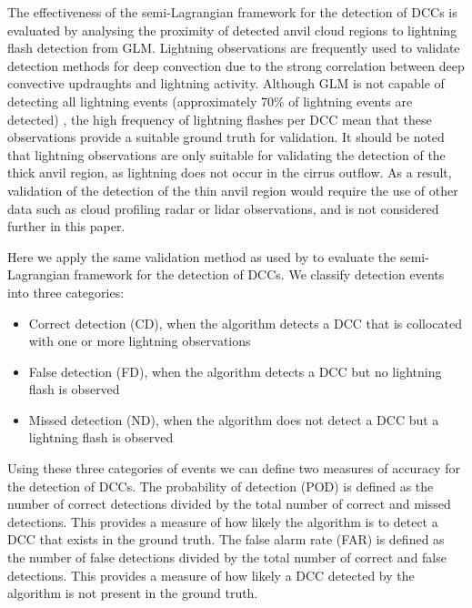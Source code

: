 \documentclass[amt, manuscript]{copernicus}
\begin{document}
The effectiveness of the semi-Lagrangian framework for the detection of DCCs is evaluated by analysing the proximity of detected anvil cloud regions to lightning flash detection from GLM.
Lightning observations are frequently used to validate detection methods for deep convection \citep[e.g.,][]{zinner_validation_2013, muller_novel_2019} due to the strong correlation between deep convective updraughts and lightning activity.
Although GLM is not capable of detecting all lightning events (approximately 70\% of lightning events are detected) \citep{peterson_removing_2020}, the high frequency of lightning flashes per DCC mean that these observations provide a suitable ground truth for validation.
It should be noted that lightning observations are only suitable for validating the detection of the thick anvil region, as lightning does not occur in the cirrus outflow.
As a result, validation of the detection of the thin anvil region would require the use of other data such as cloud profiling radar or lidar observations, and is not considered further in this paper.

Here we apply the same validation method as used by \citet{muller_novel_2019} to evaluate the semi-Lagrangian framework for the detection of DCCs.
We classify detection events into three categories:

\begin{itemize}
    \item Correct detection (CD), when the algorithm detects a DCC that is collocated with one or more lightning observations
    \item False detection (FD), when the algorithm detects a DCC but no lightning flash is observed
    \item Missed detection (ND), when the algorithm does not detect a DCC but a lightning flash is observed
\end{itemize}

Using these three categories of events we can define two measures of accuracy for the detection of DCCs.
The probability of detection (POD) is defined as the number of correct detections divided by the total number of correct and missed detections.
This provides a measure of how likely the algorithm is to detect a DCC that exists in the ground truth.
The false alarm rate (FAR) is defined as the number of false detections divided by the total number of correct and false detections.
This provides a measure of how likely a DCC detected by the algorithm is not present in the ground truth.
\end{document}
